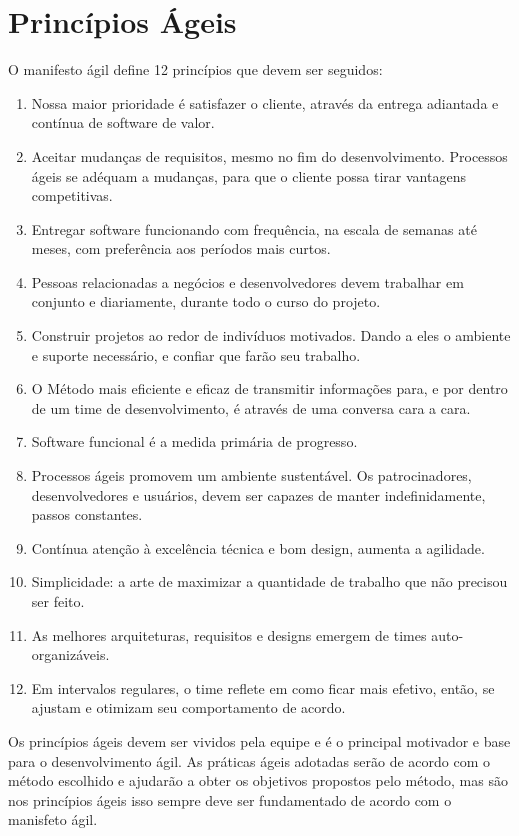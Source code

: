 \section{Princípios Ágeis}
\label{principios-ageis}
O manifesto ágil define 12 princípios que devem ser seguidos:
%
\begin{enumerate}
\item Nossa maior prioridade é satisfazer o cliente, através da entrega adiantada e contínua de software de valor.
\item Aceitar mudanças de requisitos, mesmo no fim do desenvolvimento. Processos ágeis se adéquam a mudanças, para que o cliente possa tirar vantagens competitivas.
\item Entregar software funcionando com frequência, na escala de semanas até meses, com preferência aos períodos mais curtos.
\item Pessoas relacionadas a negócios e desenvolvedores devem trabalhar em conjunto e diariamente, durante todo o curso do projeto.
\item Construir projetos ao redor de indivíduos motivados. Dando a eles o ambiente e suporte necessário, e confiar que farão seu trabalho.
\item O Método mais eficiente e eficaz de transmitir informações para, e por dentro de um time de desenvolvimento, é através de uma conversa cara a cara.
\item Software funcional é a medida primária de progresso.
\item Processos ágeis promovem um ambiente sustentável. Os patrocinadores, desenvolvedores e usuários, devem ser capazes de manter indefinidamente, passos constantes.
\item Contínua atenção à excelência técnica e bom design, aumenta a agilidade.
\item Simplicidade: a arte de maximizar a quantidade de trabalho que não precisou ser feito.
\item As melhores arquiteturas, requisitos e designs emergem de times auto-organizáveis.
\item Em intervalos regulares, o time reflete em como ficar mais efetivo, então, se ajustam e otimizam seu comportamento de acordo.
\end{enumerate}

Os princípios ágeis devem ser vividos pela equipe e é o principal motivador e base para o desenvolvimento ágil. As práticas ágeis adotadas serão de acordo com o método escolhido e ajudarão a obter os objetivos propostos pelo método, mas são nos princípios ágeis isso sempre deve ser fundamentado de acordo com o manisfeto ágil.